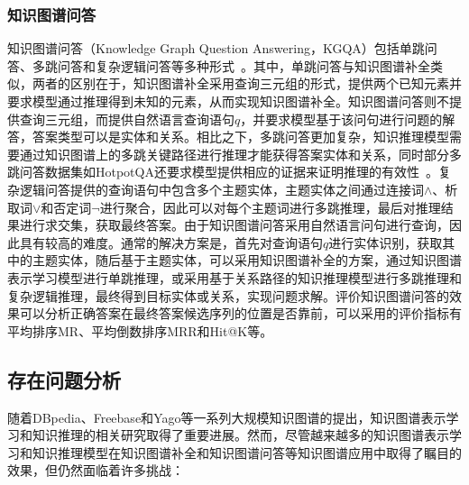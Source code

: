 \documentclass[algorithmlist, AutoFakeBold, AutoFakeSlant, figurelist, tablelist, nomlist, masters]{seuthesix}
\begin{document}
\subsubsection{知识图谱问答}
知识图谱问答（Knowledge Graph Question Answering，KGQA）包括单跳问答、多跳问答和复杂逻辑问答等多种形式~\cite{saxena2020improving}。其中，单跳问答与知识图谱补全类似，两者的区别在于，知识图谱补全采用查询三元组的形式，提供两个已知元素并要求模型通过推理得到未知的元素，从而实现知识图谱补全。知识图谱问答则不提供查询三元组，而提供自然语言查询语句$q$，并要求模型基于该问句进行问题的解答，答案类型可以是实体和关系。相比之下，多跳问答更加复杂，知识推理模型需要通过知识图谱上的多跳关键路径进行推理才能获得答案实体和关系，同时部分多跳问答数据集如HotpotQA还要求模型提供相应的证据来证明推理的有效性~\cite{yang2018hotpotqa}。复杂逻辑问答提供的查询语句中包含多个主题实体，主题实体之间通过连接词$\land$、析取词$\vee$和否定词$\neg$进行聚合，因此可以对每个主题词进行多跳推理，最后对推理结果进行求交集，获取最终答案。由于知识图谱问答采用自然语言问句进行查询，因此具有较高的难度。通常的解决方案是，首先对查询语句$q$进行实体识别，获取其中的主题实体，随后基于主题实体，可以采用知识图谱补全的方案，通过知识图谱表示学习模型进行单跳推理，或采用基于关系路径的知识推理模型进行多跳推理和复杂逻辑推理，最终得到目标实体或关系，实现问题求解。评价知识图谱问答的效果可以分析正确答案在最终答案候选序列的位置是否靠前，可以采用的评价指标有平均排序MR、平均倒数排序MRR和Hit@K等。

\subsection{存在问题分析}
随着DBpedia、Freebase和Yago等一系列大规模知识图谱的提出，知识图谱表示学习和知识推理的相关研究取得了重要进展。然而，尽管越来越多的知识图谱表示学习和知识推理模型在知识图谱补全和知识图谱问答等知识图谱应用中取得了瞩目的效果，但仍然面临着许多挑战：
\end{document}
